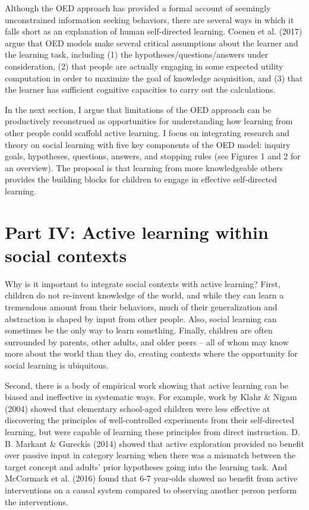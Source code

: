 \documentclass[oneside]{report}
\begin{document}
Although the OED approach has provided a formal account of seemingly
unconstrained information seeking behaviors, there are several ways in
which it falls short as an explanation of human self-directed learning.
Coenen et al. (2017) argue that OED models make several critical
assumptions about the learner and the learning task, including (1) the
hypotheses/questions/answers under consideration, (2) that people are
actually engaging in some expected utility computation in order to
maximize the goal of knowledge acquisition, and (3) that the learner has
sufficient cognitive capacities to carry out the calculations.

In the next section, I argue that limitations of the OED approach can be
productively reconstrued as opportunities for understanding how learning
from other people could scaffold active learning. I focus on integrating
research and theory on social learning with five key components of the
OED model: inquiry goals, hypotheses, questions, answers, and stopping
rules (see Figures 1 and 2 for an overview). The proposal is that
learning from more knowledgeable others provides the building blocks for
children to engage in effective self-directed learning.

\hypertarget{p4}{%
\section{Part IV: Active learning within social contexts}\label{p4}}

Why is it important to integrate social contexts with active learning?
First, children do not re-invent knowledge of the world, and while they
can learn a tremendous amount from their behaviors, much of their
generalization and abstraction is shaped by input from other people.
Also, social learning can sometimes be the only way to learn something.
Finally, children are often surrounded by parents, other adults, and
older peers -- all of whom may know more about the world than they do,
creating contexts where the opportunity for social learning is
ubiquitous.

Second, there is a body of empirical work showing that active learning
can be biased and ineffective in systematic ways. For example, work by
Klahr \& Nigam (2004) showed that elementary school-aged children were
less effective at discovering the principles of well-controlled
experiments from their self-directed learning, but were capable of
learning these principles from direct instruction. D. B. Markant \&
Gureckis (2014) showed that active exploration provided no benefit over
passive input in category learning when there was a mismatch between the
target concept and adults' prior hypotheses going into the learning
task. And McCormack et al. (2016) found that 6-7 year-olds showed no
benefit from active interventions on a causal system compared to
observing another person perform the interventions.
\end{document}
